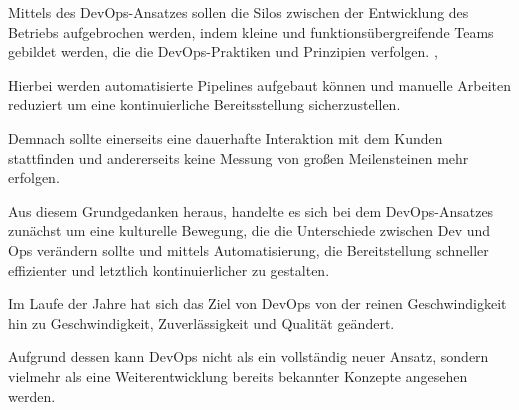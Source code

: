 Mittels des DevOps-Ansatzes sollen die Silos zwischen der Entwicklung des Betriebs aufgebrochen werden, indem kleine und funktionsübergreifende Teams gebildet werden, die die DevOps-Praktiken und Prinzipien verfolgen. \cite{ebert_devops_2016}, \cite{wiedemann_research_2019}  

Hierbei werden automatisierte Pipelines aufgebaut können und manuelle Arbeiten reduziert um eine kontinuierliche Bereitsstellung sicherzustellen. \cite[S.3,5]{verona_practical_2016}

Demnach sollte einerseits eine dauerhafte Interaktion mit dem Kunden stattfinden und andererseits keine Messung von großen Meilensteinen mehr erfolgen. \cite[S.5]{sharma_devops_2017} 

Aus diesem Grundgedanken heraus, handelte es sich bei dem DevOps-Ansatzes zunächst um eine kulturelle Bewegung, die die Unterschiede zwischen Dev und Ops verändern sollte und mittels Automatisierung, die Bereitstellung schneller effizienter und letztlich kontinuierlicher zu gestalten. \cite[S.5]{sharma_devops_2017} 

Im Laufe der Jahre hat sich das Ziel von DevOps von der reinen Geschwindigkeit hin zu Geschwindigkeit, Zuverlässigkeit und Qualität geändert.\cite[S.xxix]{sharma_devops_2017}  

Aufgrund dessen kann DevOps nicht als ein vollständig neuer Ansatz, sondern vielmehr als eine Weiterentwicklung bereits bekannter Konzepte angesehen werden. \cite[S. 23]{alt_innovationsorientiertes_2017}

